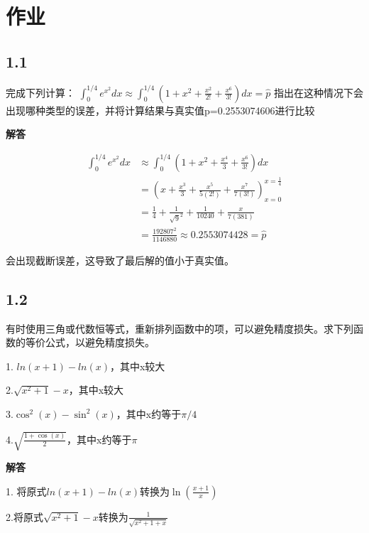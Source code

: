 \section{作业}


\subsection{1.1}

完成下列计算：
$\int_{0}^{1 / 4} e^{x^{2}} d x \approx \int_{0}^{1 / 4}\left(1+x^{2}+\frac{x^{2}}{2 !}+\frac{x^{6}}{3 !}\right) d x=\widehat{p}$
指出在这种情况下会出现哪种类型的误差，并将计算结果与真实值p=0.2553074606进行比较

\textbf{解答}

\begin{equation}
\begin{aligned} \int_{0}^{1 / 4} e^{x^{2}} d x & \approx \int_{0}^{1 / 4}\left(1+x^{2}+\frac{x^{4}}{3}+\frac{x^{6}}{3 !}\right) d x \\ &=\left(x+\frac{x^{3}}{3}+\frac{x^{5}}{5(2 !)}+\frac{x^{7}}{7(3 !)}\right)^{x=\frac{1}{4}}_{x=0}\\ &=\frac{1}{4}+\frac{1}{\sqrt{9}^{2}}+\frac{1}{10240}+\frac{x}{7(381)} \\ &=\frac{192807^{2}}{1146880} \approx 0.2553074428=\hat{p} \end{aligned}
\end{equation}



会出现截断误差，这导致了最后解的值小于真实值。

\subsection{1.2}

有时使用三角或代数恒等式，重新排列函数中的项，可以避免精度损失。求下列函数的等价公式，以避免精度损失。

1. $ln(x+1)-ln(x)$，其中x较大

2.$\sqrt{x^{2}+1}-x$，其中x较大

3.$\cos ^{2}(x)-\sin ^{2}(x)$，其中x约等于$\pi/4$

4.$\sqrt{\frac{1+\cos (x)}{2}}$，其中x约等于$\pi$



\textbf{解答}

1. 将原式$ln(x+1)-ln(x)$转换为$\ln \left(\frac{x+1}{x}\right)$

2.将原式$\sqrt{x^{2}+1}-x$转换为$\frac{1}{\sqrt{x^{2}+1+x}}$

